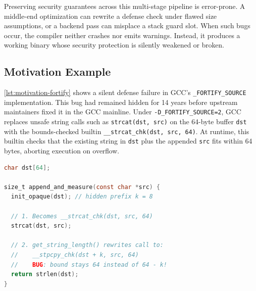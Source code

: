 \documentclass[conference,compsoc]{IEEEtran}
\begin{document}
Preserving security guarantees across this multi-stage pipeline is error-prone. A middle-end optimization can rewrite a defense check under flawed size assumptions, or a backend pass can misplace a stack guard slot. When such bugs occur, the compiler neither crashes nor emits warnings. Instead, it produces a working binary whose security protection is silently weakened or broken.

\subsection{Motivation Example}\label{sec:motivation-example}

\autoref{lst:motivation-fortify} shows a silent defense failure in GCC's \texttt{\_FORTIFY\_SOURCE} implementation. This bug had remained hidden for 14 years before upstream maintainers fixed it in the GCC mainline. Under \texttt{-D\_FORTIFY\_SOURCE=2}, GCC replaces unsafe string calls such as \texttt{strcat(dst, src)} on the 64-byte buffer \texttt{dst} with the bounds-checked builtin \texttt{\_\_strcat\_chk(dst, src, 64)}. At runtime, this builtin checks that the existing string in \texttt{dst} plus the appended \texttt{src} fits within 64 bytes, aborting execution on overflow.

\par\vspace{6pt}\noindent\begin{minipage}{\columnwidth}
\begin{lstlisting}[language=C, caption={Silent \texttt{\_FORTIFY\_SOURCE} relaxation in GCC.}, label={lst:motivation-fortify}]
char dst[64];

size_t append_and_measure(const char *src) {
  init_opaque(dst); // hidden prefix k = 8

  // 1. Becomes __strcat_chk(dst, src, 64)
  strcat(dst, src);

  // 2. get_string_length() rewrites call to:
  //    __stpcpy_chk(dst + k, src, 64)
  //    BUG: bound stays 64 instead of 64 - k!
  return strlen(dst);
}
\end{lstlisting}
\end{minipage}\par\vspace{6pt}
\end{document}
